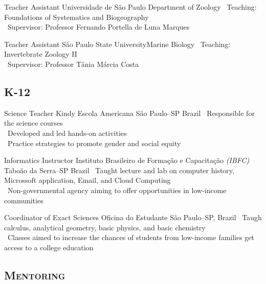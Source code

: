 \documentclass[11pt, letterpaper, sans]{moderncv}
\begin{document}
	{Teacher Assistant}
	{Universidade de São Paulo}
	{Department of Zoology}
	{}
	{\textbullet~Teaching: Foundations of Systematics and Biogeography\\
		\textbullet~Supervisor: Professor Fernando Portella de Luna Marques
	}

\vspace{.5em}

	{Teacher Assistant}
	{São Paulo State University}{Marine Biology}
	{}
	{
		\textbullet~Teaching: Invertebrate Zoology II\\
		\textbullet~Supervisor: Professor Tânia Márcia Costa
	}

\vspace{.5em}
	\subsection{\textsc{K-12}}
\vspace{.5em}

	{Science Teacher}
	{Kindy Escola Americana}
	{São Paulo--SP}
	{Brazil}
	{
		\textbullet~Responsible for the science courses\\
		\textbullet~Developed and led hands-on activities\\
		\textbullet~Practice strategies to promote gender and social equity
	}

\vspace{.5em}

	{Informatics Instructor}
	{Instituto Brasileiro de Formação e Capacitação \emph{(IBFC)}}
	{Taboão da Serra--SP}
	{Brazil}
	{
		\textbullet~Taught lecture and lab  on computer history, Microssoft application, Email, and Cloud Computing\\
		\textbullet~Non-governmental agency aiming to offer opportunities in low-income communities
	}

\vspace{.5em}

	{Coordinator of Exact Sciences}
	{Oficina do Estudante}
	{São Paulo--SP, Brazil}
	{}
	{
		\textbullet~Taugh calculus, analytical geometry, basic physics, and basic chemistry\\
		\textbullet~Classes aimed to increase the chances of students from low-income families get access to a college education
	}

\vspace{.5em}
\subsection{\textsc{Mentoring}}
\vspace{.5em}
\end{document}
